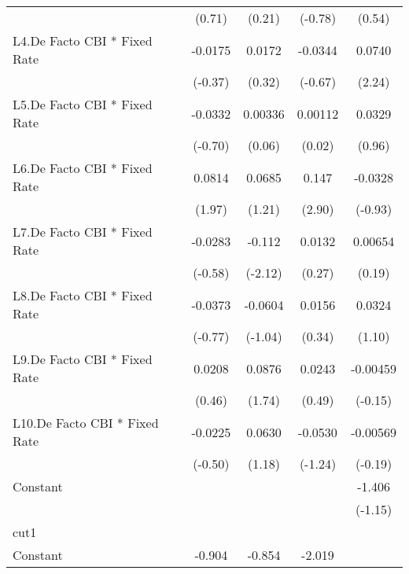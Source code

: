 {\begin{longtable}{l*{4}{c}}
                &   (0.71)         &   (0.21)         &  (-0.78)         &   (0.54)         \\
[1em]
L4.De Facto CBI * Fixed Rate&  -0.0175         &   0.0172         &  -0.0344         &   0.0740\sym{*}  \\
                &  (-0.37)         &   (0.32)         &  (-0.67)         &   (2.24)         \\
[1em]
L5.De Facto CBI * Fixed Rate&  -0.0332         &  0.00336         &  0.00112         &   0.0329         \\
                &  (-0.70)         &   (0.06)         &   (0.02)         &   (0.96)         \\
[1em]
L6.De Facto CBI * Fixed Rate&   0.0814\sym{*}  &   0.0685         &    0.147\sym{**} &  -0.0328         \\
                &   (1.97)         &   (1.21)         &   (2.90)         &  (-0.93)         \\
[1em]
L7.De Facto CBI * Fixed Rate&  -0.0283         &   -0.112\sym{*}  &   0.0132         &  0.00654         \\
                &  (-0.58)         &  (-2.12)         &   (0.27)         &   (0.19)         \\
[1em]
L8.De Facto CBI * Fixed Rate&  -0.0373         &  -0.0604         &   0.0156         &   0.0324         \\
                &  (-0.77)         &  (-1.04)         &   (0.34)         &   (1.10)         \\
[1em]
L9.De Facto CBI * Fixed Rate&   0.0208         &   0.0876         &   0.0243         & -0.00459         \\
                &   (0.46)         &   (1.74)         &   (0.49)         &  (-0.15)         \\
[1em]
L10.De Facto CBI * Fixed Rate&  -0.0225         &   0.0630         &  -0.0530         & -0.00569         \\
                &  (-0.50)         &   (1.18)         &  (-1.24)         &  (-0.19)         \\
[1em]
Constant        &                  &                  &                  &   -1.406         \\
                &                  &                  &                  &  (-1.15)         \\
\hline
cut1            &                  &                  &                  &                  \\
Constant        &   -0.904         &   -0.854         &   -2.019\sym{*}  &                  \\

\end{longtable}}
